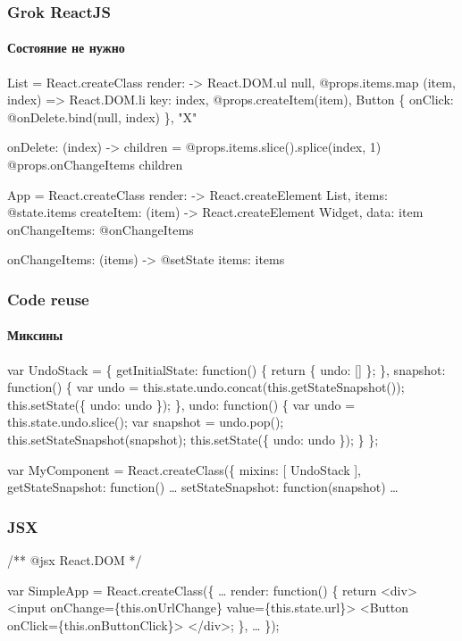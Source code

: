\documentclass[10pt,utf8]{beamer}
\begin{document}
\begin{frame}[fragile]
  \frametitle{Grok ReactJS}
  \framesubtitle{Состояние не нужно}

  \fontsize{8pt}{8.2}\selectfont

  \begin{semiverbatim}
List = React.createClass
  render: ->
    React.DOM.ul null,
      \alert{@props.items}.map (item, index) =>
        React.DOM.li key: index,
          \alert{@props.createItem}(item),
          Button \{ onClick: @onDelete.bind(null, index) \}, "X"

  onDelete: (index) ->
    children = @props.items.slice().splice(index, 1)
    @props.onChangeItems children

App = React.createClass
  render: ->
    React.createElement List,
      items: @state.\alert{items}
      createItem: (item) ->
        React.createElement \alert{Widget}, {data: item}
      onChangeItems: @onChangeItems

  onChangeItems: (items) ->
    @setState {items: items}
  \end{semiverbatim}
\end{frame}

\begin{frame}[fragile]
  \frametitle{Code reuse}
  \framesubtitle{Миксины}

  \fontsize{9pt}{9.2}\selectfont

  \begin{semiverbatim}
var UndoStack = \{
  getInitialState: function() \{
    return \{ undo: [] \};
  \},
  snapshot: function() \{
    var undo = this.state.undo.concat(\alert{this.getStateSnapshot()});
    this.setState(\{ undo: undo \});
  \},
  undo: function() \{
    var undo = this.state.undo.slice();
    var snapshot = undo.pop();
    \alert{this.setStateSnapshot(snapshot)};
    this.setState(\{ undo: undo \});
  \}
\};

var MyComponent = React.createClass(\{
  mixins: [ UndoStack ],
  getStateSnapshot: function() \dots
  setStateSnapshot: function(snapshot) \dots
  \end{semiverbatim}
\end{frame}

\begin{frame}[fragile]
  \frametitle{JSX}

  \fontsize{9pt}{9.2}\selectfont

  \begin{semiverbatim}
    /** @jsx React.DOM */

    var SimpleApp = React.createClass(\{
      \dots
      render: function() \{
        return \alert{<div>
          <input onChange=}\{this.onUrlChange\} \alert{value=}\{this.state.url\}\alert{>
          <Button onClick=}\{this.onButtonClick\}\alert{>
        </div>;}
      \},
      \dots
    \});
  \end{semiverbatim}
\end{frame}
\end{document}
